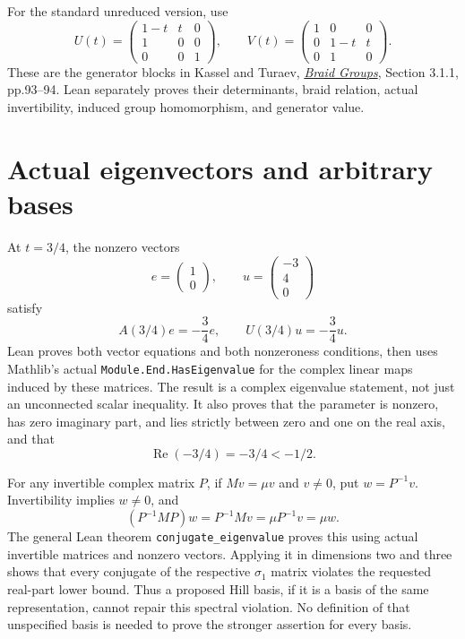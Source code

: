 \documentclass[11pt]{article}
\begin{document}
For the standard unreduced version, use
\[
 U(t)=\begin{pmatrix}1-t&t&0\\1&0&0\\0&0&1\end{pmatrix},\qquad
 V(t)=\begin{pmatrix}1&0&0\\0&1-t&t\\0&1&0\end{pmatrix}.
\]
These are the generator blocks in Kassel and Turaev,
\href{https://web.math.ucsb.edu/~bigelow/books/kasselturaev.pdf}
{\emph{Braid Groups}}, Section 3.1.1, pp.93--94.
Lean separately proves their determinants, braid relation, actual
invertibility, induced group homomorphism, and generator value.

\newpage
\section{Actual eigenvectors and arbitrary bases}
At $t=3/4$, the nonzero vectors
\[
 e=\begin{pmatrix}1\\0\end{pmatrix},\qquad
 u=\begin{pmatrix}-3\\4\\0\end{pmatrix}
\]
satisfy
\[
 A(3/4)e=-\frac34 e,\qquad
 U(3/4)u=-\frac34 u.
\]
Lean proves both vector equations and both nonzeroness conditions, then
uses Mathlib's actual \texttt{Module.End.HasEigenvalue} for the
complex linear maps induced by these matrices. The result is a complex
eigenvalue statement, not just an unconnected scalar inequality.
It also proves that the parameter is nonzero, has zero imaginary part,
and lies strictly between zero and one on the real axis, and that
\[
 \operatorname{Re}(-3/4)=-3/4<-1/2.
\]

For any invertible complex matrix $P$, if $Mv=\mu v$ and $v\ne0$,
put $w=P^{-1}v$. Invertibility implies $w\ne0$, and
\[
 (P^{-1}MP)w=P^{-1}Mv=\mu P^{-1}v=\mu w.
\]
The general Lean theorem \texttt{conjugate\_eigenvalue} proves this
using actual invertible matrices and nonzero vectors. Applying it in
dimensions two and three shows that every conjugate of the respective
$\sigma_1$ matrix violates the requested real-part lower bound.
Thus a proposed Hill basis, if it is a basis of the same representation,
cannot repair this spectral violation. No definition of that unspecified
basis is needed to prove the stronger assertion for every basis.
\end{document}
